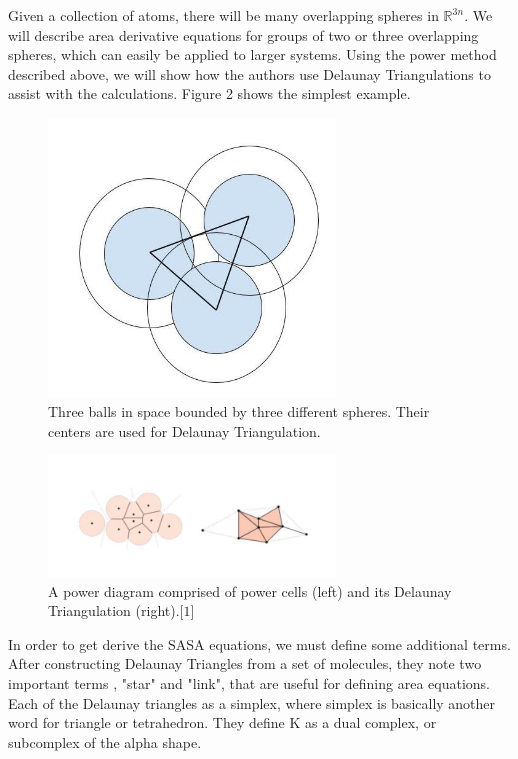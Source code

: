\documentclass{article}
\newcommand{\R}{\mathbb{R}}
\begin{document}
Given a collection of atoms, there will be many overlapping spheres in $\R^{3n}$. We will describe area derivative equations for groups of two or three overlapping spheres, which can easily be applied to larger systems. Using the power method described above, we will show how the authors use Delaunay Triangulations to assist with the calculations. Figure 2 shows the simplest example.

\begin{figure}[h!]
\caption{Three balls in space bounded by three different spheres. Their centers are used for Delaunay Triangulation.}
\centerline{\includegraphics[width=3in]{Figure2}}
\end{figure}



\begin{figure}[h!]
\caption{A power diagram comprised of power cells (left) and its Delaunay Triangulation (right).$\lbrack1\rbrack$}
\centerline{\includegraphics[width=3in]{Figure4}}
\end{figure}


In order to get derive the SASA equations, we must define some additional terms. After constructing Delaunay Triangles from a set of molecules, they note two important terms , "star" and "link", that are useful for defining area equations. Each of the Delaunay triangles as a simplex, where simplex is basically another word for triangle or tetrahedron. They define K as a dual complex, or subcomplex of the alpha shape.
\end{document}
